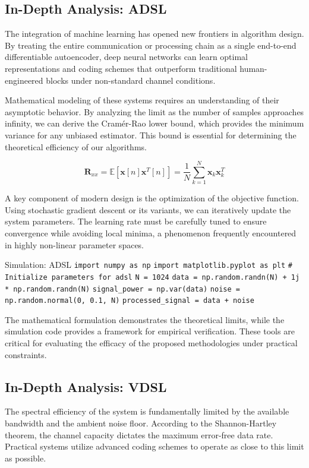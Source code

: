 \subsection{In-Depth Analysis: ADSL}
The integration of machine learning has opened new frontiers in algorithm design. By treating the entire communication or processing chain as a single end-to-end differentiable autoencoder, deep neural networks can learn optimal representations and coding schemes that outperform traditional human-engineered blocks under non-standard channel conditions.

Mathematical modeling of these systems requires an understanding of their asymptotic behavior. By analyzing the limit as the number of samples approaches infinity, we can derive the Cramér-Rao lower bound, which provides the minimum variance for any unbiased estimator. This bound is essential for determining the theoretical efficiency of our algorithms.

\begin{equation}
    \mathbf{R}_{xx} = \mathbb{E}[\mathbf{x}[n]\mathbf{x}^T[n]] = \frac{1}{N} \sum_{k=1}^{N} \mathbf{x}_k \mathbf{x}_k^T
\end{equation}

A key component of modern design is the optimization of the objective function. Using stochastic gradient descent or its variants, we can iteratively update the system parameters. The learning rate must be carefully tuned to ensure convergence while avoiding local minima, a phenomenon frequently encountered in highly non-linear parameter spaces.

\begin{pythonbox}{Simulation: ADSL}
\texttt{import numpy as np}
\texttt{import matplotlib.pyplot as plt}
\texttt{}
\texttt{\# Initialize parameters for adsl}
\texttt{N = 1024}
\texttt{data = np.random.randn(N) + 1j * np.random.randn(N)}
\texttt{signal\_power = np.var(data)}
\texttt{noise = np.random.normal(0, 0.1, N)}
\texttt{processed\_signal = data + noise}
\end{pythonbox}

\vspace{0.5cm}
The mathematical formulation demonstrates the theoretical limits, while the simulation code provides a framework for empirical verification. These tools are critical for evaluating the efficacy of the proposed methodologies under practical constraints.


\subsection{In-Depth Analysis: VDSL}
The spectral efficiency of the system is fundamentally limited by the available bandwidth and the ambient noise floor. According to the Shannon-Hartley theorem, the channel capacity dictates the maximum error-free data rate. Practical systems utilize advanced coding schemes to operate as close to this limit as possible.

